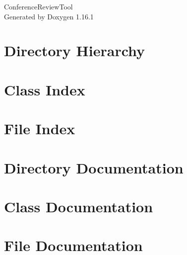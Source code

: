 \documentclass[twoside]{book}
\newcommand{\+}{\discretionary{\mbox{\scriptsize$\hookleftarrow$}}{}{}}
\newcommand{\clearemptydoublepage}{%
    \newpage{\pagestyle{empty}\cleardoublepage}%
  }
\begin{document}
  \raggedbottom
    \hypersetup{pageanchor=false,
                bookmarksnumbered=true,
                pdfencoding=unicode
               }
  \begin{titlepage}
  \vspace*{7cm}
  \begin{center}%
  {\Large Conference\+Review\+Tool}\\
  \vspace*{1cm}
  {\large Generated by Doxygen 1.16.1}\\
  \end{center}
  \end{titlepage}
  \clearemptydoublepage
  \tableofcontents
  \clearemptydoublepage
  \hypersetup{pageanchor=true}


\chapter{Directory Hierarchy}

\chapter{Class Index}

\chapter{File Index}

\chapter{Directory Documentation}

\chapter{Class Documentation}












\chapter{File Documentation}







  \backmatter
  \newpage
  \clearemptydoublepage
  \printindex
\end{document}
